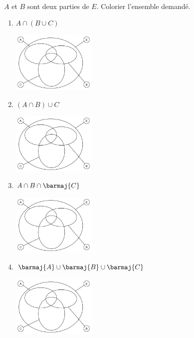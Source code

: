 \documentclass[a4paper,12pt,french]{article}
\begin{document}
\exo{}\\

$A$ et $B$ sont deux parties de $E$. Colorier l'ensemble demandé.
	\begin{multicols}{2}
    \begin{enumerate}[\bfseries 1.]
		\item 	$A\cap (B\cup C)$\\
                \begin{center}
                \includegraphics[width=4cm]{img/venn}
                \end{center}
		\item 	$(A\cap B)\cup C$\\
                \begin{center}
                \includegraphics[width=4cm]{img/venn}
                \end{center}
		\item 	$A\cap B\cap \barmaj{C}$\\
                \begin{center}
                \includegraphics[width=4cm]{img/venn}
                \end{center}
		\item 	$\barmaj{A}\cup\barmaj{B}\cup\barmaj{C}$\\
                \begin{center}
                \includegraphics[width=4cm]{img/venn}
                \end{center}
		\end{enumerate}
	\end{multicols}
\end{document}
